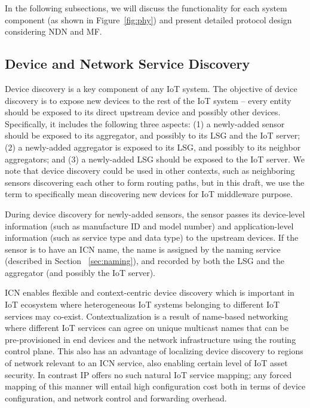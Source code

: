 In the following subsections, we will discuss the functionality for each system component (as shown in Figure~\ref{fig:phy}) and present detailed protocol design considering NDN and MF.

\subsection{Device and Network Service Discovery}
Device discovery is a key component of any IoT system.  The objective
of device discovery is to expose new devices to the rest of the IoT
system -- every entity should be exposed to its direct upstream
device and possibly other devices.  Specifically, it includes the
following three aspects: (1) a newly-added sensor should be exposed
to its aggregator, and possibly to its LSG and the IoT server; (2) a
newly-added aggregator is exposed to its LSG, and possibly to its
neighbor aggregators; and (3) a newly-added LSG should be exposed to
the IoT server.  We note that device discovery could be used in other
contexts, such as neighboring sensors discovering each other to form
routing paths, but in this draft, we use the term to specifically
mean discovering new devices for IoT middleware purpose.

During device discovery for newly-added sensors, the sensor passes
its device-level information (such as manufacture ID and model
number) and application-level information (such as service type and
data type) to the upstream devices.  If the sensor is to have an ICN
name, the name is assigned by the naming service (described in
Section ~\ref{sec:naming}), and recorded by both the LSG and the aggregator (and possibly the IoT server).

ICN enables flexible and context-centric device discovery which is
important in IoT ecosystem where heterogeneous IoT systems belonging
to different IoT services may co-exist.  Contextualization is a
result of name-based networking where different IoT services can
agree on unique multicast names that can be pre-provisioned in end
devices and the network infrastructure using the routing control
plane.  This also has an advantage of localizing device discovery to
regions of network relevant to an ICN service, also enabling certain
level of IoT asset security.  In contrast IP offers no such natural
IoT service mapping; any forced mapping of this manner will entail
high configuration cost both in terms of device configuration, and
network control and forwarding overhead.

